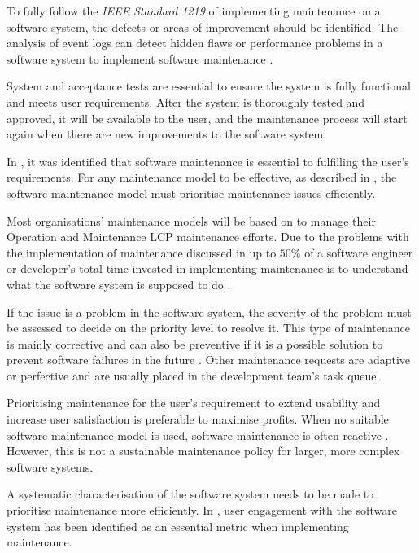 \par To fully follow the \textit{IEEE Standard 1219} of implementing maintenance on a software system, the defects or areas of improvement should be identified. The analysis of event logs can detect hidden flaws or performance problems in a software system to implement software maintenance \cite{Cinque2013, Rong2018a, Levin2019}.

\par System and acceptance tests are essential to ensure the system is fully functional and meets user requirements. After the system is thoroughly tested and approved, it will be available to the user, and the maintenance process will start again when there are new improvements to the software system.\par In , it was identified that software maintenance is essential to fulfilling the user's requirements. For any maintenance model to be effective, as described in , the software maintenance model must prioritise maintenance issues efficiently. \par Most organisations' maintenance models will be based on  to manage their Operation and Maintenance LCP maintenance efforts. Due to the problems with the implementation of maintenance discussed in  up to $50\%$ of a software engineer or developer's total time invested in implementing maintenance is to understand what the software system is supposed to do \cite{Tang2010}. \par If the issue is a problem in the software system, the severity of the problem must be assessed to decide on the priority level to resolve it. This type of maintenance is mainly corrective and can also be preventive if it is a possible solution to prevent software failures in the future \cite{Tang2010}. Other maintenance requests are adaptive or perfective and are usually placed in the development team's task queue. \par Prioritising maintenance for the user's requirement to extend usability and increase user satisfaction is preferable to maximise profits. When no suitable software maintenance model is used, software maintenance is often reactive \cite{Araujo2021}. However, this is not a sustainable maintenance policy for larger, more complex software systems. \par A systematic characterisation of the software system needs to be made to prioritise maintenance more efficiently. In , user engagement with the software system has been identified as an essential metric when implementing maintenance.


